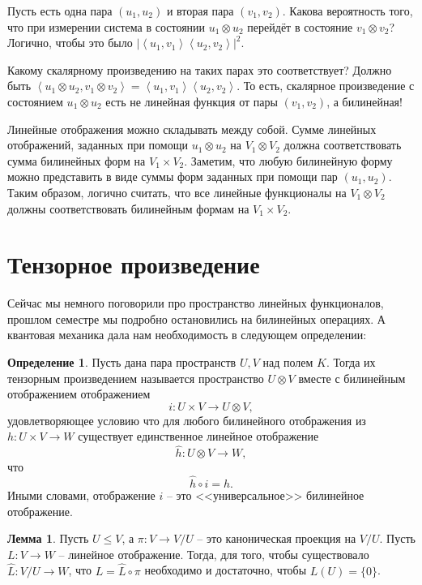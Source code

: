 \documentclass[10pt,a4paper,oneside]{book}
\theoremstyle{definition}
\newtheorem*{defn}{\color{yellow!30!red} Определение}
\newtheorem{lem}{\color{green!50!black}Лемма}
\renewcommand{\leq}{\leqslant}
\def\lan{\left\langle }
\def\ran{\right\rangle}
\def\dfn{\begin{defn}}
\def\edfn{\end{defn}}
\def\lm{\begin{lem}}
\def\elm{\end{lem}}
\begin{document}
Пусть есть одна пара $(u_1,u_2)$ и вторая пара $(v_1,v_2)$. Какова вероятность того, что при измерении система в состоянии $u_1\otimes u_2$ перейдёт  в состояние $v_1 \otimes v_2$? Логично, чтобы это было $|\lan u_1,v_1 \ran \lan u_2, v_2\ran|^2$.

Какому скалярному произведению на таких парах это соответствует? Должно быть $\lan u_1\otimes u_2, v_1\otimes v_2\ran = \lan u_1,v_1 \ran \lan u_2, v_2\ran$. То есть, скалярное произведение с состоянием $u_1\otimes u_2$ есть не линейная функция от пары $(v_1, v_2)$, а билинейная!



Линейные отображения можно складывать между собой. Сумме линейных отображений, заданных при помощи $u_1\otimes u_2$ на $V_1\otimes V_2$ должна соответствовать сумма билинейных форм на $V_1\times V_2$. Заметим, что любую билинейную форму можно представить в виде суммы форм заданных при помощи пар $(u_1,u_2)$. Таким образом, логично считать, что все линейные функционалы на $V_1\otimes V_2$ должны соответствовать билинейным формам на $V_1\times V_2$.





\section{Тензорное произведение}

Сейчас мы немного поговорили про пространство линейных функционалов, прошлом семестре мы подробно остановились на билинейных операциях. А квантовая механика дала нам необходимость в следующем определении:

\dfn Пусть дана пара пространств $U,V$ над полем $K$. Тогда их тензорным произведением называется пространство 
$U\otimes V$ вместе с билинейным отображением отображением
$$i \colon U \times  V \to U \otimes V,$$
удовлетворяющее условию что для любого билинейного отображения из $h\colon U \times V \to W$ существует единственное линейное отображение 
$$\hat{h}\colon U\otimes V \to W,$$
что 
$$\hat{h}\circ i=h.$$
Иными словами, отображение $i$ -- это <<универсальное>> билинейное отображение.
\edfn 


\lm Пусть $U\leq V$, а $\pi \colon V \to V/U$ -- это каноническая проекция на $V/U$. Пусть $L\colon V \to W$ -- линейное отображение. Тогда, для того, чтобы существовало $\hat{L}\colon V/U \to W$, что $L=\hat{L}\circ \pi$ необходимо и достаточно, чтобы $L(U)=\{0\}$.
\elm
\end{document}
